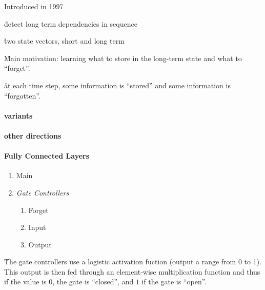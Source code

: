 Introduced in 1997 %

\r{detect long term dependencies in sequence}

\r{two state vectors, short and long term}

\r{Main motivation: learning what to store in the long-term state and what to ``forget''.}

\r{at each time step, some information is ``stored'' and some information is ``forgotten''.}

\paragraph{variants}





\paragraph{other directions}


\paragraph{Fully Connected Layers}


\begin{enumerate}[noitemsep,topsep=0pt]
	\item Main
	\item \textit{Gate Controllers}
	\begin{enumerate}[noitemsep,topsep=0pt]
		\item Forget
		\item Input
		\item Output
	\end{enumerate}
\end{enumerate}

\r{The gate controllers use a logistic activation fuction (output a range from 0 to 1). This output is then fed through an element-wise multiplication function and thus if the value is $0$, the gate is ``closed'', and $1$ if the gate is ``open''.}


